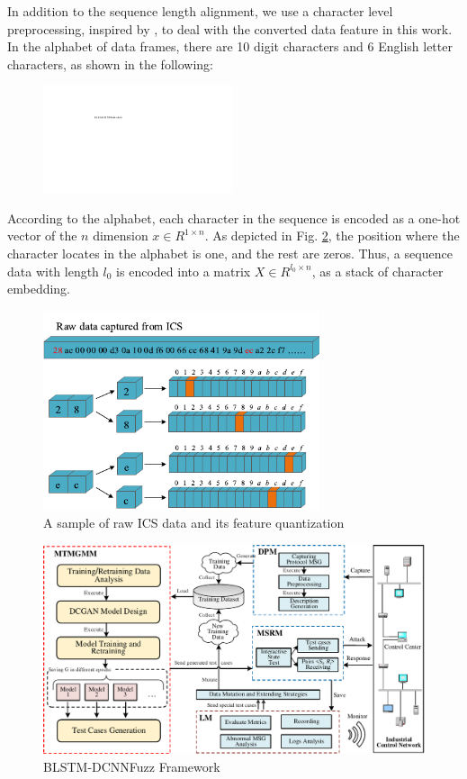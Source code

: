 In addition to the sequence length alignment, we use a character level preprocessing, inspired by \cite{zhang2015character}, to deal with the converted data feature in this work. In the alphabet of data frames, there are 10 digit characters and 6 English letter characters, as shown in the following:
\begin{figure}[htbp]   %
	\centering 
	\includegraphics[width=2.2in]{FIGURE_LV/FIGURE_SET.pdf}
	\label{FIGURE_SET}
\end{figure}

According to the alphabet, each character in the sequence is encoded as a one-hot vector of the $n$ dimension $x\in R^{1 \times n}$. As depicted in Fig. \ref{FigOneHot}, the position where the character locates in the alphabet is one, and the rest are zeros. Thus, a sequence data with length $l_0$ is encoded into a matrix $ X \in R^{l_0 \times n}$, as a stack of character embedding. 
\begin{figure}[htbp]
\centering
\includegraphics[width=3.2in]{FIGURE_LV/FigOneHot.pdf}
\caption{A sample of raw ICS data and its feature quantization}
\label{FigOneHot}
\end{figure}


\begin{figure}[htbp] 		 %
	\centering
	\includegraphics[width=5.5in]{FIGURE_LV/FigFramework.pdf}
	\caption{BLSTM-DCNNFuzz Framework}
	\label{FigFramework}
\end{figure} 

